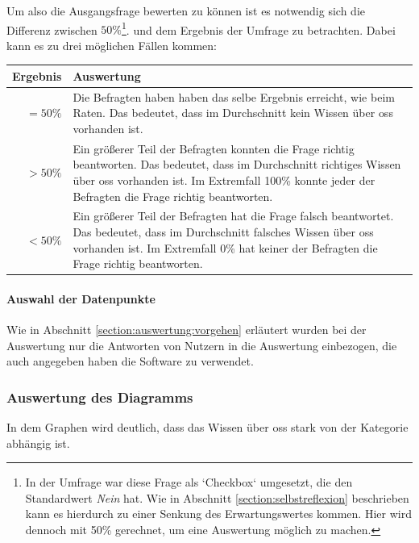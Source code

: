 \documentclass[a4paper]{article}
\begin{document}
                    Um also die Ausgangsfrage bewerten zu können ist es notwendig sich die Differenz zwischen $50\%$\footnote{In der Umfrage war diese Frage als `Checkbox` umgesetzt, die den Standardwert \emph{Nein} hat. Wie in Abschnitt \ref{section:selbstreflexion} beschrieben kann es hierdurch zu einer Senkung des Erwartungswertes kommen. Hier wird dennoch mit 50\% gerechnet, um eine Auswertung möglich zu machen.}. und dem Ergebnis der Umfrage zu betrachten. Dabei kann es zu drei möglichen Fällen kommen:\\
            
                    \begin{tabularx}{\textwidth}{rX}
                        \textbf{Ergebnis} & \textbf{Auswertung} \\\hline
                        $= 50 \%$ & Die Befragten haben haben das selbe Ergebnis erreicht, wie beim Raten. Das bedeutet, dass im Durchschnitt kein Wissen über \gls{oss} vorhanden ist.\\
                        $> 50 \%$ & Ein größerer Teil der Befragten konnten die Frage richtig beantworten. Das bedeutet, dass im Durchschnitt richtiges Wissen über \gls{oss} vorhanden ist. Im Extremfall 100\% konnte jeder der Befragten die Frage richtig beantworten.\\
                        $< 50 \%$ & Ein größerer Teil der Befragten hat die Frage falsch beantwortet. Das bedeutet, dass im Durchschnitt falsches Wissen über \gls{oss} vorhanden ist. Im Extremfall 0\% hat keiner der Befragten die Frage richtig beantworten.  
                    \end{tabularx}
            
                \paragraph{Auswahl der Datenpunkte}
                    Wie in Abschnitt \ref{section:auswertung:vorgehen} erläutert wurden bei der Auswertung nur die Antworten von Nutzern in die Auswertung einbezogen, die auch angegeben haben die Software zu verwendet.
                                        
            \subsubsection{Auswertung des Diagramms}\label{section:knowledge_analysis}
                In dem Graphen wird deutlich, dass das Wissen über \gls{oss} stark von der Kategorie abhängig ist. %
            
\end{document}
